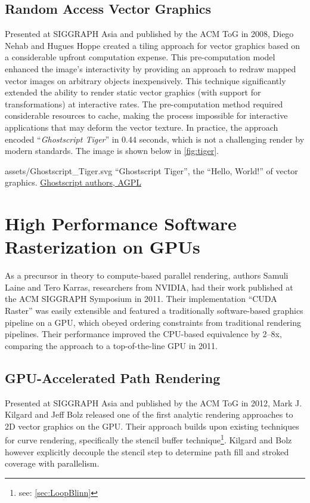 \subsection{Random Access Vector Graphics}\label{sec:RAVG}
Presented at SIGGRAPH Asia and published by the ACM ToG in 2008, Diego Nehab and Hugues Hoppe created a tiling approach for vector graphics based on a considerable upfront computation expense. This pre-computation model enhanced the image's interactivity by providing an approach to redraw mapped vector images on arbitrary objects inexpensively\cite{Nehab08}. This technique significantly extended the ability to render static vector graphics (with support for transformations) at interactive rates. The pre-computation method required considerable resources to cache, making the process impossible for interactive applications that may deform the vector texture. In practice, the approach encoded ``\textit{Ghostscript Tiger}'' in 0.44 seconds\cite{Nehab08}, which is not a challenging render by modern standards. The image is shown below in \cref{fig:tiger}.\medskip

\smallsvg
{assets/Ghostscript_Tiger.svg}
{``Ghostscript Tiger'', the ``Hello, World!'' of vector graphics.\label{fig:tiger}}
{\href{http://www.gnu.org/licenses/agpl.html}{Ghostscript authors, AGPL}}

\section{High Performance Software Rasterization on GPUs}
 As a precursor in theory to compute-based parallel rendering, authors Samuli Laine and Tero Karras, researchers from NVIDIA, had their work published at the ACM SIGGRAPH Symposium in 2011. Their implementation ``CUDA Raster'' was easily extensible and featured a traditionally software-based graphics pipeline on a GPU, which obeyed ordering constraints from traditional rendering pipelines. Their performance improved the CPU-based equivalence by 2–8x, comparing the approach to a top-of-the-line GPU in 2011\cite{Laine11}.

\subsection{GPU-Accelerated Path Rendering}
Presented at SIGGRAPH Asia and published by the ACM ToG in 2012, Mark J. Kilgard and Jeff Bolz released one of the first analytic rendering approaches to 2D vector graphics on the GPU. Their approach builds upon existing techniques for curve rendering, specifically the stencil buffer technique\footnote{see: \cref{sec:LoopBlinn}}. Kilgard and Bolz however explicitly decouple the stencil step to determine path fill and stroked coverage with parallelism\cite{Kilgard12}.

